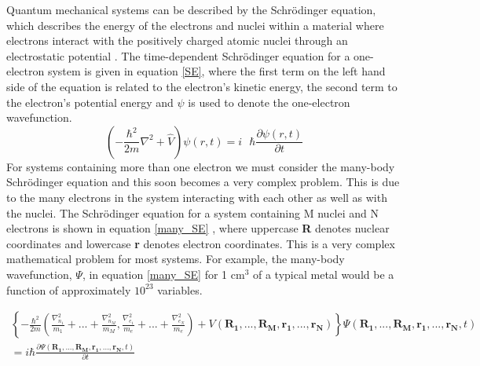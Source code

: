 \documentclass[11pt, twoside]{report}
\begin{document}
Quantum mechanical systems can be described by the Schr{\"o}dinger equation, which describes the energy of the electrons and nuclei within a material where electrons interact with the positively charged atomic nuclei through an electrostatic potential \cite{Lesar}. The time-dependent Schr{\"o}dinger equation for a one-electron system is given in equation \ref{SE}, where the first term on the left hand side of the equation is related to the electron's kinetic energy, the second term to the electron's potential energy and $\psi$ is used to denote the one-electron wavefunction.
\begin{equation} \label{SE}
\left( - \frac{\hbar^2}{2m} \nabla^2 + \hat{V} \right)\psi(r,t) = i\text{ } \hbar\frac{\partial \psi(r,t)}{\partial t}
\end{equation}
For systems containing more than one electron we must consider the many-body Schr{\"o}dinger equation and this soon becomes a very complex problem. This is due to the many electrons in the system interacting with each other as well as with the nuclei. The Schr{\"o}dinger equation for a system containing M nuclei and N electrons is shown in equation \ref{many_SE} \cite{Lesar}, where uppercase \textbf{R} denotes nuclear coordinates and lowercase \textbf{r} denotes electron coordinates. This is a very complex mathematical problem for most systems. For example, the many-body wavefunction, $\Psi$, in equation \ref{many_SE} for 1 cm$^3$ of a typical metal would be a function of approximately $10^{23}$ variables.

\begin{multline}  \label{many_SE}
\left\{ - \frac{\hbar^2}{2m} \left( \frac{\nabla_{n_1}^2}{m_1} + ... + \frac{\nabla_{n_M}^2}{m_M}, 
\frac{\nabla_{e_1}^2}{m_e} + ... + \frac{\nabla_{e_N}^2}{m_e} \right)
+ V \left( \mathbf{R_1},...,\mathbf{R_M}, \mathbf{r_1}, ..., \mathbf{r_N} \right)
\right\}
\Psi (\mathbf{R_1},...,\mathbf{R_M}, \mathbf{r_1}, ..., \mathbf{r_N}, t) \\
= i\hbar \frac{\partial\Psi(\mathbf{R_1},...,\mathbf{R_M}, \mathbf{r_1}, ..., \mathbf{r_N},t)}{\partial t}
\end{multline}
\end{document}
